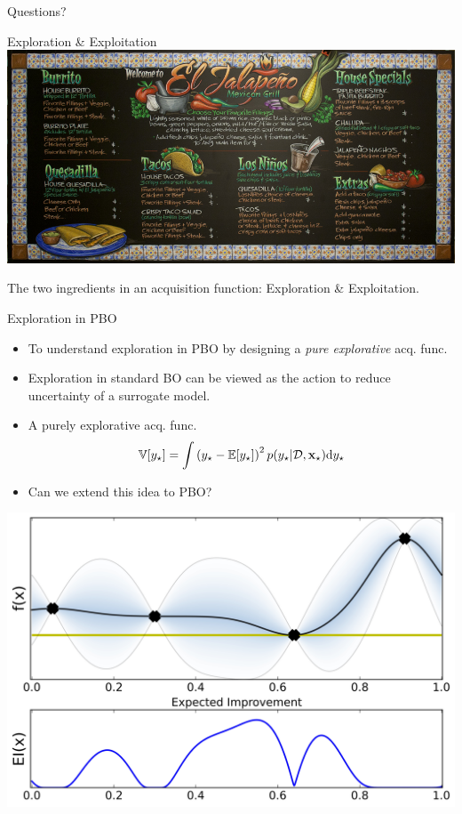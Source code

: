 \documentclass[13pt,aspectratio=1610]{beamer}
\newcommand{\E}{\mathbb{E}}
\newcommand{\V}{\mathbb{V}}
\begin{document}
\begin{frame}{}
Questions?
\end{frame}


\appendix

\begin{frame}{Exploration \& Exploitation}
\centering
\includegraphics[width=.93\textwidth]{menu.jpg} 

The two ingredients in an acquisition function: Exploration \& Exploitation.
\end{frame}

\begin{frame}{Exploration in PBO}
\begin{minipage}{0.65\textwidth}
\begin{itemize}
\item To understand exploration in PBO by designing a \emph{pure explorative} acq. func.
\item Exploration in standard BO can be viewed as the action to reduce uncertainty of a surrogate model.
\item A purely explorative acq. func. 
$$\V[ y_{\star}]  = \int \left(y_{\star} - \E[ y_{\star}] \right)^2 p (y_{\star} | \dataSet,  \inputVector_\star) \dif{y_{\star}} $$
\item Can we extend this idea to PBO?
\end{itemize}
\end{minipage}
%
\begin{minipage}{0.33\textwidth}
\centering 
\includegraphics[width=1.\textwidth]{EI.jpeg}
\end{minipage}
\end{frame}
\end{document}
